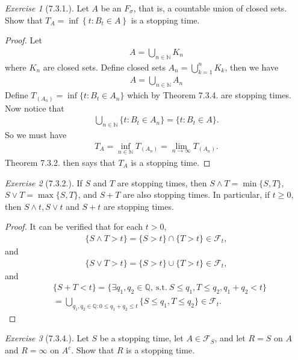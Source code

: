 \documentclass[12pt,a4paper]{amsart}
\theoremstyle{plain}
\theoremstyle{definition}
\theoremstyle{remark}
\newtheorem*{exe}{Exercise}
\numberwithin{equation}{section}
\begin{document}
\begin{exe}[7.3.1.]
Let $A$ be an $F_\sigma$, that is, a countable union of closed sets.
Show that $T_A = \inf\left\{ t : B_t \in A \right\}$ is a stopping time.
\end{exe}
\begin{proof}
Let 
\begin{align}
A = \bigcup_{n \in \mathbb N} K_n
\end{align}
where $K_n$ are closed sets. 
Define closed sets $A_n = \bigcup_{k = 1}^n K_k$, then we have
\begin{align}
A = \bigcup_{n \in \mathbb N} A_n
\end{align}
Define $T_{(A_n)} = \inf\{t : B_t \in A_n\}$ which by Theorem 7.3.4. are stopping times.
Now notice that 
\begin{align}
\bigcup_{n \in \mathbb N} \{t : B_t \in A_n\} = \{t: B_t \in A\}.
\end{align}
So we must have 
\begin{align}
T_A = \inf_{n\in \mathbb N} T_{(A_n)} = \lim_{n\to \infty} T_{(A_n)}. 
\end{align}
Theorem 7.3.2. then says that $T_A$ is a stopping time.
\end{proof}
\begin{exe}[7.3.2.]
If $S$ and $T$ are stopping times, then $S \wedge T = \min \{S, T\}$, $S\vee T = \max\{S, T\}$, and $S+T$ are also stopping times.
In particular, if $t \geq 0$, then $S \wedge t, S \vee t$ and $S+ t$ are stopping times.
\end{exe}
\begin{proof}
It can be verified that for each $t> 0$,
\begin{align}
\{S \wedge T > t\} = \{S > t\} \cap \{T > t\} \in \mathcal F_t,
\end{align}
and
\begin{align}
\{S \vee T > t\}= \{S>t\} \cup \{T > t\} \in \mathcal F_t,
\end{align}
and
\begin{align}
&\{S + T < t\} = \{\exists q_1,q_2 \in \mathbb Q,~\text{s.t.}~S \leq q_1, T \leq q_2, q_1 + q_2 < t\}
\\&= \bigcup_{q_1,q_2 \in \mathbb Q: 0 \leq q_1 + q_2 \leq t} \{S \leq q_1, T\leq q_2\} \in \mathcal F_t. 
\end{align}
\end{proof}
\begin{exe}[7.3.4.]
Let $S$ be a stopping time, let $A \in \mathcal F_S$, and let $R = S$ on $A$ and $R = \infty$ on $A^c$. 
Show that $R$ is a stopping time.
\end{exe}
\end{document}
